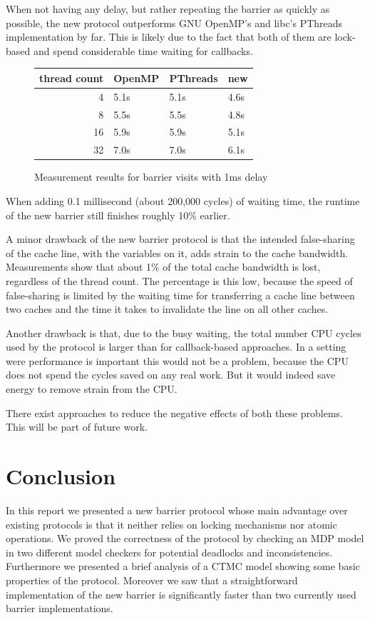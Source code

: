 \documentclass[a4paper, 10pt]{article}
\begin{document}
When not having any delay, but rather repeating the barrier as quickly as possible, the new protocol outperforms GNU OpenMP's and libc's PThreads implementation by far. This is likely due to the fact that both of them are lock-based and spend considerable time waiting for callbacks.

\begin{figure}[htbp]
	\centering
	\begin{tabular}{r | l l l}
		thread count& OpenMP & PThreads & new \\
		\hline
		 4          & 5.1s   & 5.1s     & 4.6s \\
		 8          & 5.5s   & 5.5s     & 4.8s \\
		16          & 5.9s   & 5.9s     & 5.1s \\
		32          & 7.0s   & 7.0s     & 6.1s \\
	\end{tabular}
	\caption{Measurement results for barrier visits with 1ms delay}
	\label{fig:measurement-2}
\end{figure}

When adding 0.1 millisecond (about 200,000 cycles) of waiting time, the runtime of the new barrier still finishes roughly 10\% earlier.

A minor drawback of the new barrier protocol is that the intended false-sharing of the cache line, with the variables on it, adds strain to the cache bandwidth. Measurements show that about 1\% of the total cache bandwidth is lost, regardless of the thread count. The percentage is this low, because the speed of false-sharing is limited by the waiting time for transferring a cache line between two caches and the time it takes to invalidate the line on all other caches.

Another drawback is that, due to the busy waiting, the total number CPU cycles used by the protocol is larger than for callback-based approaches. In a setting were performance is important this would not be a problem, because the CPU does not spend the cycles saved on any real work. But it would indeed save energy to remove strain from the CPU.

There exist approaches to reduce the negative effects of both these problems. This will be part of future work.

\section{Conclusion}
In this report we presented a new barrier protocol whose main advantage over existing protocols is that it neither relies on locking mechanisms nor atomic operations.
We proved the correctness of the protocol by checking an MDP model in two different model checkers for potential deadlocks and inconsistencies.
Furthermore we presented a brief analysis of a CTMC model showing some basic properties of the protocol.
Moreover we saw that a straightforward implementation of the new barrier is significantly faster than two currently used barrier implementations.
\end{document}
